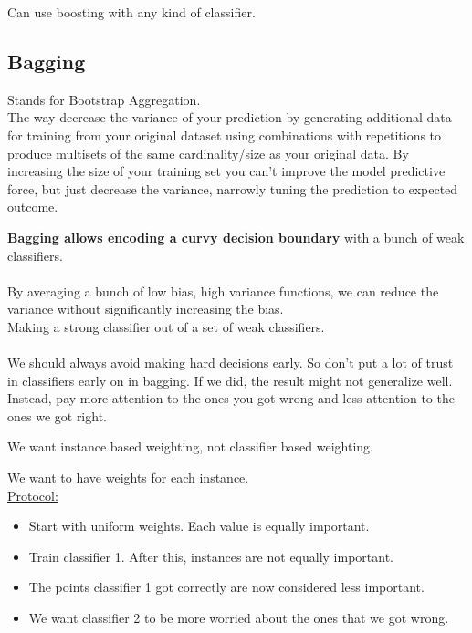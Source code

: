 Can use boosting with any kind of classifier.  %

\subsection{Bagging}

Stands for Bootstrap Aggregation. \hfill \\
The way decrease the variance of your prediction by generating additional data for training from your original dataset using combinations with repetitions to produce multisets of the same cardinality/size as your original data. By increasing the size of your training set you can't improve the model predictive force, but just decrease the variance, narrowly tuning the prediction to expected outcome.  %

\textbf{Bagging allows encoding a curvy decision boundary} with a bunch of weak classifiers. \hfill \\
 \hfill \\

By averaging a bunch of low bias, high variance functions, we can reduce the variance without significantly increasing the bias. \hfill \\

Making a strong classifier out of a set of weak classifiers. \hfill \\
\hfill \\

We should always avoid making hard decisions early.  %
So don't put a lot of trust in classifiers early on in bagging. 
If we did, the result might not generalize well.  \hfill \\

Instead, pay more attention to the ones you got wrong and less attention to the ones we got right.  %

We want instance based weighting, not classifier based weighting.  %

We want to have weights for each instance. \hfill \\  
\underline{Protocol:}  %
\begin{itemize}
	\item Start with uniform weights.  Each value is equally important. 
	\item Train classifier 1.  After this, instances are not equally important. 
	\item The points classifier 1 got correctly are now considered less important. 
	\item We want classifier 2 to be more worried about the ones that we got wrong. 
\end{itemize}

